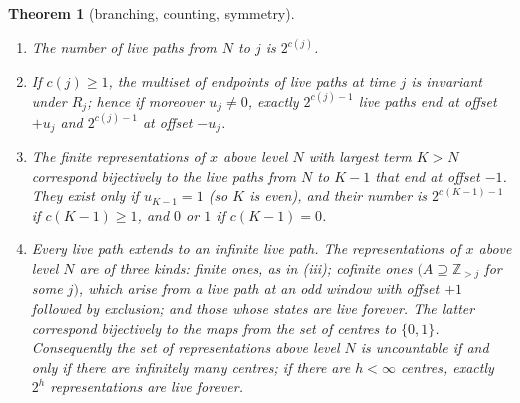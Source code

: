 \documentclass[11pt]{amsart}
\newtheorem{theorem}{Theorem}[section]
\theoremstyle{definition}
\theoremstyle{remark}
\newcommand{\Z}{\mathbb{Z}}
\begin{document}
\begin{theorem}[branching, counting, symmetry]\label{thm:count}
\begin{enumerate}[label=\textup{(\roman*)}]
\item The number of live paths from $N$ to $j$ is $2^{c(j)}$.
\item If $c(j)\ge1$, the multiset of endpoints of live paths at time $j$ is invariant under $R_j$; hence if moreover $u_j\ne0$, exactly $2^{c(j)-1}$ live paths end at offset $+u_j$ and $2^{c(j)-1}$ at offset $-u_j$.
\item The finite representations of $x$ above level $N$ with largest term $K>N$ correspond bijectively to the live paths from $N$ to $K-1$ that end at offset $-1$. They exist only if $u_{K-1}=1$ \textup{(}so $K$ is even\textup{)}, and their number is $2^{c(K-1)-1}$ if $c(K-1)\ge1$, and $0$ or $1$ if $c(K-1)=0$.
\item Every live path extends to an infinite live path. The representations of $x$ above level $N$ are of three kinds: finite ones, as in \textup{(iii)}; cofinite ones $(A\supseteq\Z_{>j}$ for some $j)$, which arise from a live path at an odd window with offset $+1$ followed by exclusion; and those whose states are live forever. The latter correspond bijectively to the maps from the set of centres to $\{0,1\}$. Consequently the set of representations above level $N$ is uncountable if and only if there are infinitely many centres; if there are $h<\infty$ centres, exactly $2^h$ representations are live forever.
\end{enumerate}
\end{theorem}
\end{document}
